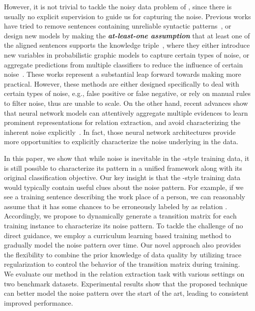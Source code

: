 However, it is not trivial to tackle the noisy data problem of \DS, since there is usually no explicit supervision to guide us for capturing the noise.  
Previous works have tried to remove sentences containing unreliable syntactic patterns~\cite{takamatsu2012reducing},  or design new models by making the \textbf{\textit{at-least-one assumption}}  that at least one of the aligned sentences supports the knowledge triple~\cite{riedel2010modeling}, where they either introduce new variables in probabilistic graphic models to capture certain types of noise, or aggregate predictions from multiple classifiers to reduce the influence of certain noise~\cite{hoffmann2011knowledge,surdeanu2012multi,ritter2013modeling,min2013distant}. These works represent a substantial leap forward towards making \DS more practical. However, these methods are either designed specifically to deal with certain types of noise, e.g., false positive or false negative, or  rely on manual rules to filter noise, thus are unable to scale. 
On the other hand, recent advances show that neural network models can attentively aggregate multiple evidences to learn prominent representations for relation extraction, and avoid characterizing the inherent noise explicitly~\cite{zeng2015distant,lin2016neural}. In fact, those neural network architectures provide more opportunities to explicitly characterize the noise underlying in the data.    

In this paper, we show that while noise is inevitable in the \DS-style training data, it is still possible to characterize its pattern  in a unified framework along with its original classification objective. Our key insight is that the \DS-style training  data would typically contain useful clues about the noise pattern. For example, if we see a training sentence describing the work place of a person, we can reasonably assume that it has some chances to be erroneously labeled by \DS as relation  .
Accordingly, we propose to dynamically generate a transition matrix for each training instance to characterize its noise pattern.  To tackle the challenge of no direct guidance, we employ a curriculum learning based training method to gradually model the noise pattern over time. Our novel approach also provides the flexibility to combine the prior knowledge of data quality by utilizing trace regularization to control the behavior of the transition matrix during training. 
We evaluate our method in the relation extraction task with various settings on two benchmark datasets. Experimental results show 
that  the proposed technique can better model the noise pattern over the start of the art, leading to consistent improved performance. 


